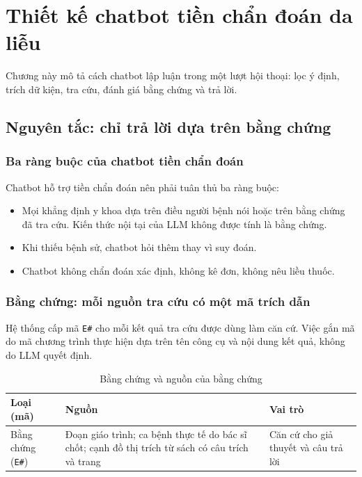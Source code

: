 \chapter[\MakeUppercase{Thiết kế chatbot tiền chẩn đoán da liễu}]{Thiết kế chatbot tiền chẩn đoán da liễu}
\label{ch:chuong5}

Chương này mô tả cách chatbot lập luận trong một lượt hội thoại: lọc ý định, trích dữ kiện, tra cứu, đánh giá bằng chứng và trả lời.

\section{Nguyên tắc: chỉ trả lời dựa trên bằng chứng}

\subsection{Ba ràng buộc của chatbot tiền chẩn đoán}

Chatbot hỗ trợ tiền chẩn đoán nên phải tuân thủ ba ràng buộc:
\begin{itemize}
  \item Mọi khẳng định y khoa dựa trên điều người bệnh nói hoặc trên bằng chứng đã tra cứu. Kiến thức nội tại của LLM không được tính là bằng chứng.
  \item Khi thiếu bệnh sử, chatbot hỏi thêm thay vì suy đoán.
  \item Chatbot không chẩn đoán xác định, không kê đơn, không nêu liều thuốc.
\end{itemize}

\subsection{Bằng chứng: mỗi nguồn tra cứu có một mã trích dẫn}

Hệ thống cấp mã \texttt{E\#} cho mỗi kết quả tra cứu được dùng làm căn cứ. Việc gắn mã do mã chương trình thực hiện dựa trên tên công cụ và nội dung kết quả, không do LLM quyết định.

\begin{table}[H]
\centering
\caption{Bằng chứng và nguồn của bằng chứng}
\label{tab:evidence}
\small
\begin{tabular}{|p{2.8cm}|p{6.2cm}|p{5.0cm}|}
\hline
\textbf{Loại (mã)} & \textbf{Nguồn} & \textbf{Vai trò} \\ \hline
Bằng chứng (\texttt{E\#}) & Đoạn giáo trình; ca bệnh thực tế do bác sĩ chốt; cạnh đồ thị trích từ sách có câu trích và trang & Căn cứ cho giả thuyết và câu trả lời \\ \hline
\end{tabular}
\end{table}


